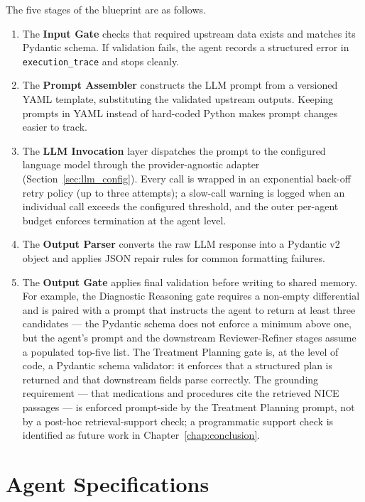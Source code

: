 The five stages of the blueprint are as follows.
\begin{enumerate}
  \item The \textbf{Input Gate} checks that required upstream data exists and
  matches its Pydantic schema. If validation fails, the agent records a
  structured error in \texttt{execution\_\allowbreak trace} and stops cleanly.
  \item The \textbf{Prompt Assembler} constructs the LLM prompt from a
  versioned YAML template, substituting the validated upstream outputs.
  Keeping prompts in YAML instead of hard-coded Python makes prompt changes
  easier to track.
  \item The \textbf{LLM Invocation} layer dispatches the prompt to the
  configured language model through the provider-agnostic adapter
  (Section~\ref{sec:llm_config}). Every call is wrapped in an exponential
  back-off retry policy (up to three attempts); a slow-call warning is
  logged when an individual call exceeds the configured threshold, and
  the outer per-agent budget enforces termination at the agent level.
  \item The \textbf{Output Parser} converts the raw LLM response into a
  Pydantic v2 object and applies JSON repair rules for common formatting
  failures.
  \item The \textbf{Output Gate} applies final validation before writing to
  shared memory. For example, the Diagnostic Reasoning gate requires a
  non-empty differential and is paired with a prompt that instructs the
  agent to return at least three candidates --- the Pydantic schema
  does not enforce a minimum above one, but the agent's prompt and the
  downstream Reviewer-Refiner stages assume a populated top-five
  list. The Treatment Planning gate is, at the level of code, a Pydantic
  schema validator: it enforces that a structured plan is returned and
  that downstream fields parse correctly. The grounding requirement ---
  that medications and procedures cite the retrieved NICE passages ---
  is enforced prompt-side by the Treatment Planning prompt, not by a
  post-hoc retrieval-support check; a programmatic support check is identified
  as future work in Chapter~\ref{chap:conclusion}.
\end{enumerate}

\FloatBarrier
\section{Agent Specifications}
\label{sec:agents}

